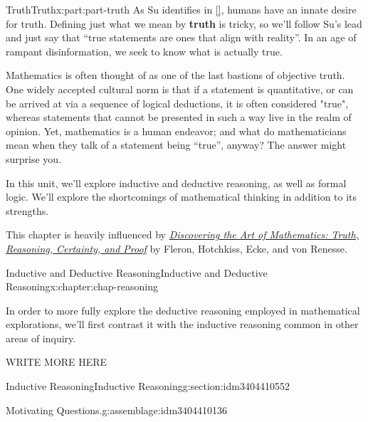 \documentclass[oneside,10pt,]{book}
\newcommand{\xreffont}{\relax}
\newcommand{\terminology}[1]{\textbf{#1}}
\numberwithin{equation}{section}
\begin{document}
\begin{partptx}{Truth}{}{Truth}{}{}{x:part:part-truth}
 As Su identifies in \hyperlink{x:biblio:Su2020}{[{\xreffont 1}]}, humans have an innate desire for truth. Defining just what we mean by \terminology{truth} is tricky, so we'll follow Su's lead and just say that ``true statements are ones that align with reality''. In an age of rampant disinformation, we seek to know what is actually true.%
\par
Mathematics is often thought of as one of the last bastions of objective truth. One widely accepted cultural norm is that if a statement is quantitative, or can be arrived at via a sequence of logical deductions, it is often considered "true", whereas statements that cannot be presented in such a way live in the realm of opinion. Yet, mathematics is a human endeavor; and what do mathematicians mean when they talk of a statement being ``true'', anyway? The answer might surprise you.%
\par
In this unit, we'll explore inductive and deductive reasoning, as well as formal logic. We'll explore the shortcomings of mathematical thinking in addition to its strengths.%
\par
This chapter is heavily influenced by \emph{\href{https://www.artofmathematics.org/books/truth-reasoning-certainty-and-proof}{Discovering the Art of Mathematics: Truth, Reasoning, Certainty, and Proof}} by Fleron, Hotchkiss, Ecke, and von Renesse.%
%
\typeout{************************************************}
\typeout{************************************************}
%
\begin{chapterptx}{Inductive and Deductive Reasoning}{}{Inductive and Deductive Reasoning}{}{}{x:chapter:chap-reasoning}
\begin{introduction}{}%
In order to  more fully explore the deductive reasoning employed in mathematical explorations, we'll first contrast it with the inductive reasoning common in other areas of inquiry.%
\par
WRITE MORE HERE%
\end{introduction}%
%
%
\typeout{************************************************}
\typeout{************************************************}
%
\begin{sectionptx}{Inductive Reasoning}{}{Inductive Reasoning}{}{}{g:section:idm3404410552}
\begin{assemblage}{Motivating Questions.}{g:assemblage:idm3404410136}%

\end{assemblage}
\end{sectionptx}
\end{chapterptx}
\end{partptx}
\end{document}
